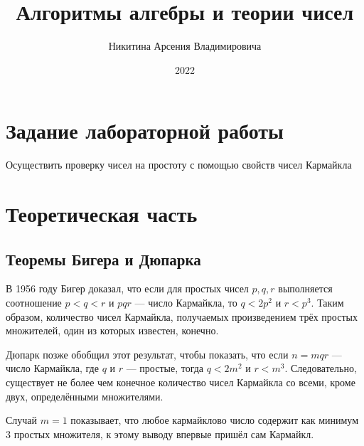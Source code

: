 \documentclass[bachelor, och, labwork]{shiza}
\begin{document}
\title{Алгоритмы алгебры и теории чисел}





\author{Никитина Арсения Владимировича}




\date{2022}

\maketitle



\tableofcontents

\section{Задание лабораторной работы}

Осуществить проверку чисел на простоту с помощью свойств чисел Кармайкла

\section{Теоретическая часть}

\subsection{Теоремы Бигера и Дюпарка}

В 1956 году Бигер доказал, что если для простых чисел 
$p, q, r$ выполняется соотношение $p<q<r$ и $pqr$ --- число Кармайкла, то $q < 2p^2$ и $r<p^{3}$. 
Таким образом, количество чисел Кармайкла, получаемых произведением трёх простых 
множителей, один из которых известен, конечно.

Дюпарк позже обобщил этот результат, чтобы показать, что 
если $n=mqr$ --- число Кармайкла, где $q$ и $r$ --- простые, тогда 
$q<2m^{2}$ и $r<m^{3}$. Следовательно, существует не более чем конечное 
количество чисел Кармайкла со всеми, кроме двух, определёнными множителями.

Случай $m = 1$ показывает, что любое кармайклово число содержит как минимум 3 
простых множителя, к этому выводу впервые пришёл сам Кармайкл.
\end{document}

